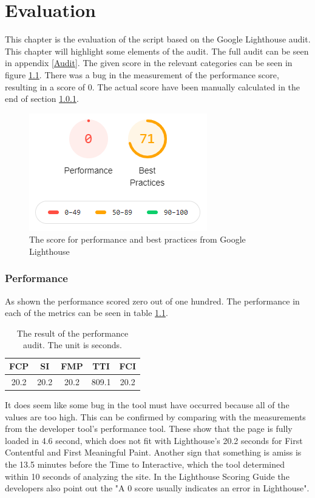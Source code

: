 \chapter{Evaluation}\label{Eval}
This chapter is the evaluation of the script based on the Google Lighthouse audit. This chapter will highlight some elements of the audit. The full audit can be seen in appendix \ref{Audit}. The given score in the relevant categories can be seen in figure \ref{LighthouseGrade}. There was a bug in the measurement of the performance score, resulting in a score of 0. The actual score have been manually calculated in the end of section \ref{EvalPerform}. 

\begin{figure} [H]
	\centering
	\includegraphics[width=.4\textwidth]{Pictures/LighthouseGrade}
	\caption{The score for performance and best practices from Google Lighthouse}
	\label{LighthouseGrade}
\end{figure}

\subsection{Performance}\label{EvalPerform}
As shown the performance scored zero out of one hundred. The performance in each of the metrics can be seen in table \ref{PerformanceAuditValues}.

\begin{table}[htbp]
	\centering
	\begin{tabular}{|c|c|c|c|c|}
		\hline 
		FCP & SI & FMP & TTI & FCI \\ 
		\hline 
		20.2 & 20.2 & 20.2 & 809.1 & 20.2 \\ 
		\hline 
	\end{tabular} 
	\caption{The result of the performance audit. The unit is seconds.}
	\label{PerformanceAuditValues}
\end{table}

It does seem like some bug in the tool must have occurred because all of the values are too high. This can be confirmed by comparing with the measurements from the developer tool’s performance tool. These show that the page is fully loaded in 4.6 second, which does not fit with Lighthouse’s 20.2 seconds for First Contentful and First Meaningful Paint. Another sign that something is amiss is the 13.5 minutes before the Time to Interactive, which the tool determined within 10 seconds of analyzing the site. In the Lighthouse Scoring Guide the developers also point out the "A 0 score usually indicates an error in Lighthouse"\citep{ScoringZeroIsBad}.

